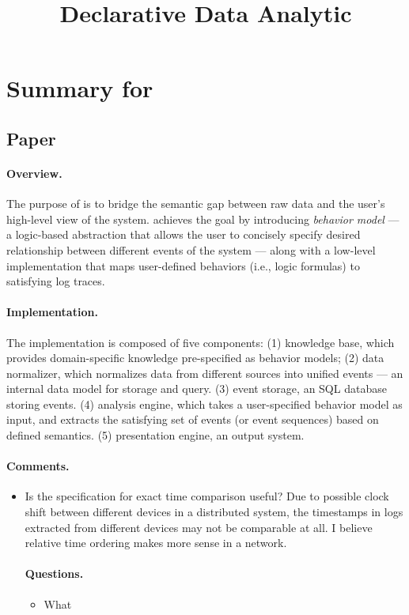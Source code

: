 \documentclass{article}
\begin{document}


\title{Declarative Data Analytic}
\author{}

\maketitle

\section{Summary for \saf}
\label{sec:saf}

\subsection{Paper}
\label{sec:safpaper}

\paragraph{Overview.}
The purpose of \saf\cite{arun2011} is to bridge the semantic gap between raw
data and the user's high-level view of the system. \saf achieves the goal by
introducing {\em behavior model} --- a logic-based abstraction that allows the user to
concisely specify desired relationship between different events of the system --- along
with a low-level implementation that maps user-defined behaviors (i.e., logic
formulas) to satisfying log traces. 

\paragraph{Implementation.}
The implementation is composed of five components: 
(1) knowledge base, which provides domain-specific knowledge pre-specified as behavior
models; 
(2) data normalizer, which normalizes data from different sources into unified
events --- an internal data model for storage and query.
(3) event storage, an SQL database storing events.
(4) analysis engine, which takes a user-specified behavior model as input, and
extracts the satisfying set of events (or event sequences) based on defined
semantics.
(5) presentation engine, an output system.

\paragraph{Comments.}
\begin{itemize}
\item Is the specification for exact time comparison useful? Due to possible
  clock shift between different devices in a distributed system, the timestamps
  in logs extracted from different devices may not be comparable at all. I
  believe relative time ordering makes more sense in a network.

\paragraph{Questions.}
\begin{itemize}
\item What
\end{itemize}
  
\end{itemize}
\end{document}
